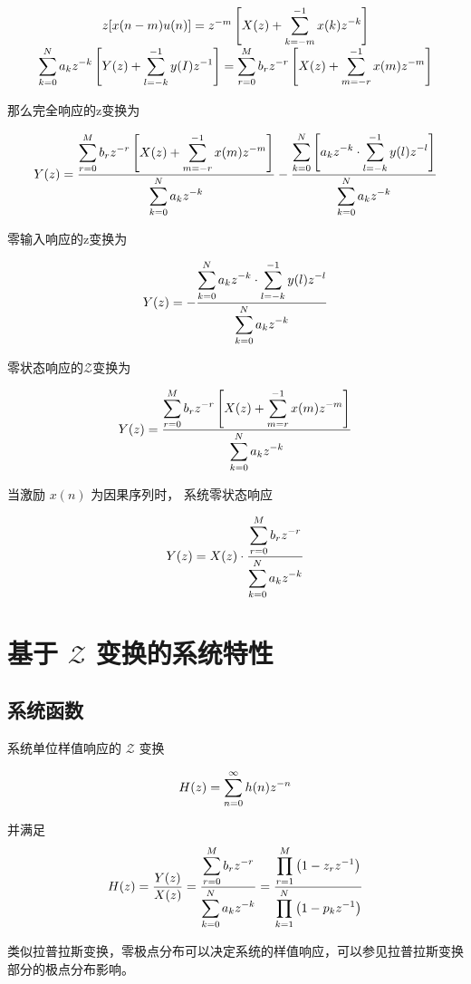 \documentclass[cn,11pt,chinese,black,simple]{../elegantbook}
\begin{document}
\[
\begin{array}{c}
z[x( n - m ) u ( n )]= z ^{-m}\left[ X ( z )+\displaystyle\sum_{k=-m}^{-1} x ( k ) z ^{-k}\right] \\
\displaystyle\sum_{k=0}^{N} a _{k} z ^{-k}\left[ Y ( z )+\displaystyle\sum_{l=-k}^{-1} y (I) z ^{-1}\right]=\displaystyle\sum_{r=0}^{M} b _{r} z ^{-r}\left[ X ( z )+\displaystyle\sum_{m=-r}^{-1} x ( m ) z ^{-m}\right]
\end{array}
\]

那么完全响应的z变换为

\[
Y(z)=\dfrac{\displaystyle\sum_{r=0}^{M} b_{r} z^{-r}\left[X(z)+\displaystyle\sum_{m=-r}^{-1} x(m) z^{-m}\right]}{\displaystyle\sum_{k=0}^{N} a_{k} z^{-k}}-\dfrac{\displaystyle\sum_{k=0}^{N}\left[a_{k} z^{-k} \cdot \displaystyle\sum_{l=-k}^{-1} y(l) z^{-l}\right]}{\displaystyle\sum_{k=0}^{N} a_{k} z^{-k}}
\]

零输入响应的z变换为

\[
Y(z)=-\dfrac{\displaystyle\sum_{k=0}^{N} a_{k} z^{-k} \cdot \displaystyle\sum_{l=-k}^{-1} y(l) z^{-l}}{\displaystyle\sum_{k=0}^{N} a_{k} z^{-k}}
\]

零状态响应的\(\mathscr{Z}\)变换为

\[
Y(z)=\dfrac{\displaystyle\sum_{r=0}^{M} b_{r} z^{-r}\left[X(z)+\displaystyle\sum_{m=r}^{-1} x(m) z^{-m}\right]}{\displaystyle\sum_{k=0}^{N} a_{k} z^{-k}}
\]

当激励 \(x(n)\) 为因果序列时， 系统零状态响应

\[
Y(z)=X(z) \cdot \dfrac{\displaystyle\sum_{r=0}^{M} b_{r} z^{-r}}{\displaystyle\sum_{k=0}^{N} a_{k} z^{-k}}
\]

\section{基于 \(\mathscr{Z}\) 变换的系统特性}

\subsection{系统函数}

系统单位样值响应的 \(\mathscr{Z}\) 变换

\[H(z) = \displaystyle\sum_{n = 0}^\infty h(n) z^{-n}\] 

并满足 \[H(z) = \dfrac{Y(z)}{X(z)} = \dfrac{\displaystyle\sum_{r=0}^M b_r z^{-r}}{\displaystyle\sum_{k=0}^N a_k z^{-k}}=\dfrac{\displaystyle\prod_{r=1}^{M}\left(1-z_{r} z^{-1}\right)}{\displaystyle\prod_{k=1}^{N}\left(1-p_{k} z^{-1}\right)}\]

类似拉普拉斯变换，零极点分布可以决定系统的样值响应，可以参见拉普拉斯变换部分的极点分布影响。
\end{document}
